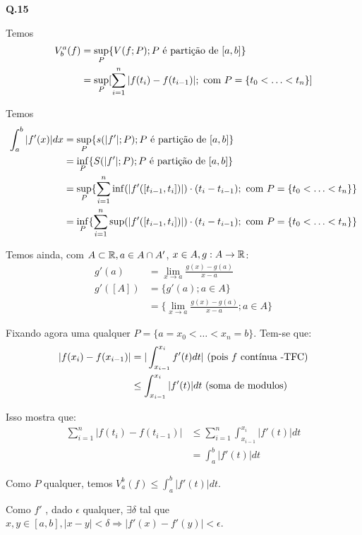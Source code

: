 \textbf{Q.15}

Temos 
\begin{align*}
	V^a_b (f) &= \underset{P}{\sup}\{V(f;P); P \text{ \eh \particao de } [a,b]\} \\
	&= \underset{P}{\sup}[\sum_{i=1}^n |f(t_i) - f(t_{i-1})|; \text{ com } P = \{t_0 < \ldots < t_n\}]
\end{align*}

Temos \tambem 
\begin{align*}
	\int_a^b|f'(x)|dx &= \underset{P}{\sup}\{s(|f'|;P); P \text{ \eh \particao de } [a,b]\} \\
	&= \underset{P}{\inf}\{S(|f'|;P); P \text{ \eh \particao de } [a,b]\} \\
	&= \underset{P}{\sup}\{\sum_{i=1}^n \inf (|f'([t_{i-1}, t_i])|)\cdot(t_i - t_{i-1}); \text{ com } P = \{t_0 < \ldots < t_n\}\} \\
	&= \underset{P}{\inf}\{\sum_{i=1}^n \sup (|f'([t_{i-1}, t_i])|)\cdot(t_i - t_{i-1}); \text{ com } P = \{t_0 < \ldots < t_n\}\}
\end{align*}

Temos ainda, com $A \subset \R, a \in A\cap A'$, $x\in A, g:A\rightarrow\R$:
\begin{align*}
	g'(a) &= \lim_{x\rightarrow a} \frac{g(x)-g(a)}{x-a} \\
	g'([A]) &= \{g'(a); a\in A\} \\
	&= \{\lim_{x\rightarrow a} \frac{g(x)-g(a)}{x-a}; a \in A\}
\end{align*}

Fixando agora uma \particao qualquer $P = \{a=x_0 < \ldots < x_n = b\}$. Tem-se que:
\begin{align*}
	|f(x_i) - f(x_{i-1})| &= |\int_{x_{i-1}}^{x_i} f'(t)dt| \text{ (pois $f$ \continua -TFC}) \\
	&\leq \int_{x_{i-1}}^{x_i} |f'(t)|dt \text{ (soma de modulos)}
\end{align*}

Isso mostra que:
\begin{align*}
	\sum_{i=1}^n |f(t_i) - f(t_{i-1})| &\leq \sum_{i=1}^n \int_{x_{i-1}}^{x_i}|f'(t)|dt \\
	&= \int_{a}^{b}|f'(t)|dt
\end{align*}

Como $P$ qualquer, temos $V_a^b (f) \leq \int_{a}^{b}|f'(t)|dt$.

Como $f'$ \eh \continua, dado $\epsilon$ qualquer, $\exists \delta$ tal que $x,y \in [a,b], |x-y| < \delta \Rightarrow |f'(x) - f'(y)| < \epsilon$.

